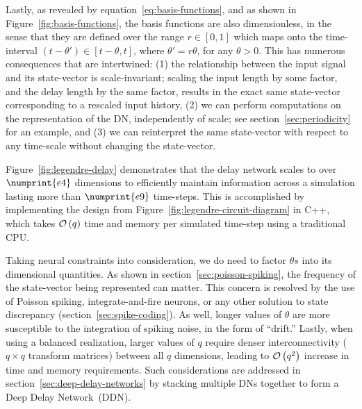 Lastly, as revealed by equation~\ref{eq:basis-functions}, and as shown in Figure~\ref{fig:basis-functions}, the basis functions are also dimensionless, in the sense that they are defined over the range $r \in [0, 1]$ which maps onto the time-interval $(t - \theta') \in [t - \theta, t]$, where $\theta' = r \theta$, for any $\theta > 0$.
This has numerous consequences that are intertwined: (1) the relationship between the input signal and its state-vector is scale-invariant; scaling the input length by some factor, and the delay length by the same factor, results in the exact same state-vector corresponding to a rescaled input history, (2) we can perform computations on the representation of the DN, independently of scale; see section~\ref{sec:periodicity} for an example, and (3) we can reinterpret the same state-vector with respect to any time-scale without changing the state-vector.


Figure~\ref{fig:legendre-delay} demonstrates that the delay network scales to over $\numprint{e4}$ dimensions to efficiently maintain information across a simulation lasting more than $\numprint{e9}$ time-steps.
This is accomplished by implementing the design from Figure~\ref{fig:legendre-circuit-diagram} in C++, which takes $\mathcal{O}\left({q}\right)$ time and memory per simulated time-step using a traditional CPU.

Taking neural constraints into consideration, we do need to factor $\theta s$ into its dimensional quantities.
As shown in section~\ref{sec:poisson-spiking}, the frequency of the state-vector being represented can matter.
This concern is resolved by the use of Poisson spiking, integrate-and-fire neurons, or any other solution to state discrepancy (section~\ref{sec:spike-coding}).
As well, longer values of $\theta$ are more susceptible to the integration of spiking noise, in the form of ``drift.''
Lastly, when using a balanced realization, larger values of $q$ require denser interconnectivity ($q \times q$ transform matrices) between all $q$ dimensions, leading to $\mathcal{O}\left({q^2}\right)$ increase in time and memory requirements.
Such considerations are addressed in section~\ref{sec:deep-delay-networks} by stacking multiple DNs together to form a Deep Delay Network~(DDN).

